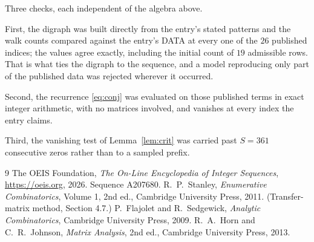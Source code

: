\documentclass[11pt,a4paper]{article}
\theoremstyle{plain}
\theoremstyle{definition}
\begin{document}
Three checks, each independent of the algebra above.

First, the digraph was built directly from the entry's stated patterns and the walk counts
compared against the entry's DATA at every one of the $26$ published indices; the
values agree exactly, including the initial count of $19$ admissible rows. That is
what ties the digraph to the sequence, and a model reproducing only part of the published
data was rejected wherever it occurred.

Second, the recurrence \eqref{eq:conj} was evaluated on those published terms in exact
integer arithmetic, with no matrices involved, and vanishes at every index the entry claims.

Third, the vanishing test of Lemma~\ref{lem:crit} was carried past $S=361$ consecutive
zeros rather than to a sampled prefix.

\begin{thebibliography}{9}
 The OEIS Foundation, \emph{The On-Line Encyclopedia of Integer
Sequences}, \url{https://oeis.org}, 2026. Sequence A207680.
 R.~P.~Stanley, \emph{Enumerative Combinatorics}, Volume 1, 2nd ed.,
Cambridge University Press, 2011. (Transfer-matrix method, Section 4.7.)
 P.~Flajolet and R.~Sedgewick, \emph{Analytic Combinatorics}, Cambridge
University Press, 2009.
 R.~A.~Horn and C.~R.~Johnson, \emph{Matrix Analysis}, 2nd ed., Cambridge
University Press, 2013.
\end{thebibliography}
\end{document}
